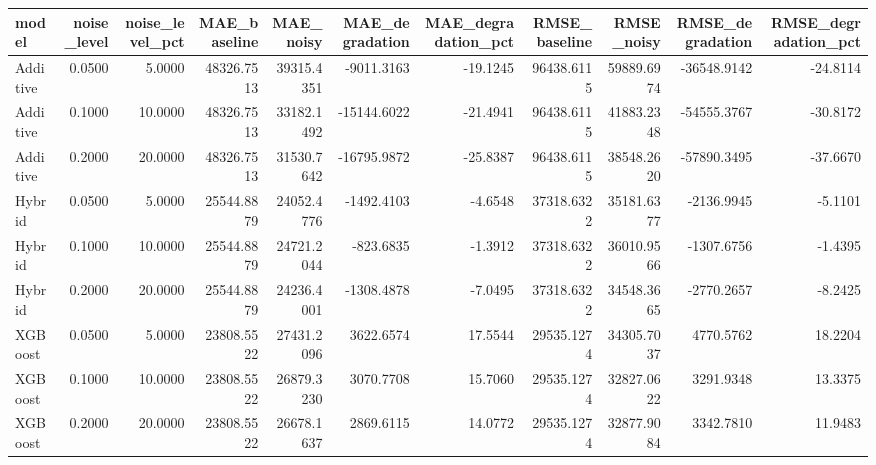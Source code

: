 \begin{tabular}{lrrrrrrrrrr}
\toprule
model & noise_level & noise_level_pct & MAE_baseline & MAE_noisy & MAE_degradation & MAE_degradation_pct & RMSE_baseline & RMSE_noisy & RMSE_degradation & RMSE_degradation_pct \\
\midrule
Additive & 0.0500 & 5.0000 & 48326.7513 & 39315.4351 & -9011.3163 & -19.1245 & 96438.6115 & 59889.6974 & -36548.9142 & -24.8114 \\
Additive & 0.1000 & 10.0000 & 48326.7513 & 33182.1492 & -15144.6022 & -21.4941 & 96438.6115 & 41883.2348 & -54555.3767 & -30.8172 \\
Additive & 0.2000 & 20.0000 & 48326.7513 & 31530.7642 & -16795.9872 & -25.8387 & 96438.6115 & 38548.2620 & -57890.3495 & -37.6670 \\
Hybrid & 0.0500 & 5.0000 & 25544.8879 & 24052.4776 & -1492.4103 & -4.6548 & 37318.6322 & 35181.6377 & -2136.9945 & -5.1101 \\
Hybrid & 0.1000 & 10.0000 & 25544.8879 & 24721.2044 & -823.6835 & -1.3912 & 37318.6322 & 36010.9566 & -1307.6756 & -1.4395 \\
Hybrid & 0.2000 & 20.0000 & 25544.8879 & 24236.4001 & -1308.4878 & -7.0495 & 37318.6322 & 34548.3665 & -2770.2657 & -8.2425 \\
XGBoost & 0.0500 & 5.0000 & 23808.5522 & 27431.2096 & 3622.6574 & 17.5544 & 29535.1274 & 34305.7037 & 4770.5762 & 18.2204 \\
XGBoost & 0.1000 & 10.0000 & 23808.5522 & 26879.3230 & 3070.7708 & 15.7060 & 29535.1274 & 32827.0622 & 3291.9348 & 13.3375 \\
XGBoost & 0.2000 & 20.0000 & 23808.5522 & 26678.1637 & 2869.6115 & 14.0772 & 29535.1274 & 32877.9084 & 3342.7810 & 11.9483 \\
\bottomrule
\end{tabular}
